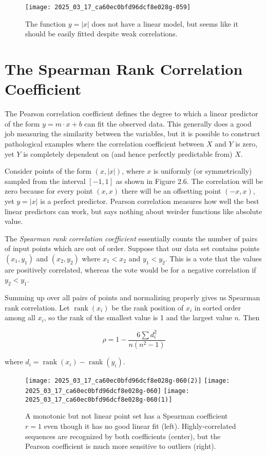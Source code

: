\documentclass[10pt]{article}
\begin{document}
\begin{figure}[ht]
\centering
\texttt{[image: 2025\_03\_17\_ca60ec0bfd96dcf8e028g-059]}
\caption{The function $y=|x|$ does not have a linear model, but seems like it should be easily fitted despite weak correlations.}
\end{figure}

\section*{The Spearman Rank Correlation Coefficient}
The Pearson correlation coefficient defines the degree to which a linear predictor of the form $y=m \cdot x+b$ can fit the observed data. This generally does a good job measuring the similarity between the variables, but it is possible to construct pathological examples where the correlation coefficient between $X$ and $Y$ is zero, yet $Y$ is completely dependent on (and hence perfectly predictable from) $X$.

Consider points of the form $(x,|x|)$, where $x$ is uniformly (or symmetrically) sampled from the interval $[-1,1]$ as shown in Figure 2.6. The correlation will be zero because for every point $(x, x)$ there will be an offsetting point $(-x, x)$, yet $y=|x|$ is a perfect predictor. Pearson correlation measures how well the best linear predictors can work, but says nothing about weirder functions like absolute value.

The \textit{Spearman rank correlation coefficient} essentially counts the number of pairs of input points which are out of order. Suppose that our data set contains points $\left(x_{1}, y_{1}\right)$ and $\left(x_{2}, y_{2}\right)$ where $x_{1}<x_{2}$ and $y_{1}<y_{2}$. This is a vote that the values are positively correlated, whereas the vote would be for a negative correlation if $y_{2}<y_{1}$.

Summing up over all pairs of points and normalizing properly gives us Spearman rank correlation. Let $\operatorname{rank}\left(x_{i}\right)$ be the rank position of $x_{i}$ in sorted order among all $x_{i}$, so the rank of the smallest value is 1 and the largest value $n$. Then

\[
\rho=1-\frac{6 \sum d_{i}^{2}}{n\left(n^{2}-1\right)}
\]

where $d_{i}=\operatorname{rank}\left(x_{i}\right)-\operatorname{rank}\left(y_{i}\right)$.\\

\begin{figure}[ht]
\centering
\texttt{[image: 2025\_03\_17\_ca60ec0bfd96dcf8e028g-060(2)]}
\texttt{[image: 2025\_03\_17\_ca60ec0bfd96dcf8e028g-060]}
\texttt{[image: 2025\_03\_17\_ca60ec0bfd96dcf8e028g-060(1)]}
\caption{A monotonic but not linear point set has a Spearman coefficient $r=1$ even though it has no good linear fit (left). Highly-correlated sequences are recognized by both coefficients (center), but the Pearson coefficient is much more sensitive to outliers (right).}
\end{figure}
\end{document}
